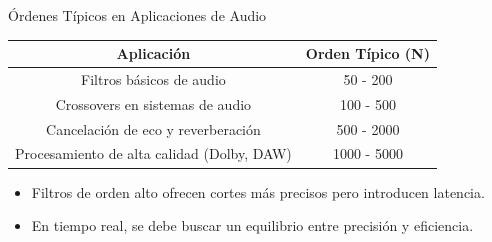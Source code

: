\documentclass[handout]{beamer}
\numberwithin{section}{part}
\begin{document}
\begin{frame}{Órdenes Típicos en Aplicaciones de Audio}
  \begin{table}[]
      \centering
      \begin{tabular}{|c|c|}
          \hline
          \textbf{Aplicación} & \textbf{Orden Típico (N)} \\
          \hline
          Filtros básicos de audio & 50 - 200 \\
          Crossovers en sistemas de audio & 100 - 500 \\
          Cancelación de eco y reverberación & 500 - 2000 \\
          Procesamiento de alta calidad (Dolby, DAW) & 1000 - 5000 \\
          \hline
      \end{tabular}
      \begin{itemize}\footnotesize
          \item Filtros de orden alto ofrecen cortes más precisos pero introducen latencia.
          \item En tiempo real, se debe buscar un equilibrio entre precisión y eficiencia.
      \end{itemize}
  \end{table}
\end{frame}
\end{document}
